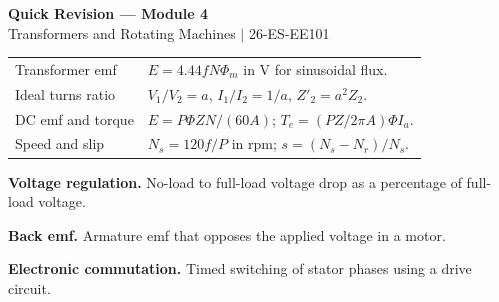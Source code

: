 \documentclass[12pt,a4paper]{article}
\renewcommand{\arraystretch}{1.45}
\begin{document}
\newpage
\begin{center}
  {\large\bfseries\color{myred} Quick Revision --- Module 4}\\[3pt]
  {\small\color{mydark} Transformers and Rotating Machines $|$ 26-ES-EE101}
\end{center}
\noindent{\color{myred}\rule{\linewidth}{1.2pt}}
\vspace{4pt}

\begin{tcolorbox}[formulabox, title={Key Formulas and Concepts at a Glance}]
\renewcommand{\arraystretch}{1.35}
\begin{tabularx}{\linewidth}{B{4.4cm}Y}
Transformer emf & $E=4.44fN\Phi_m$ in V for sinusoidal flux. \\[3pt]
Ideal turns ratio & $V_1/V_2=a$, $I_1/I_2=1/a$, $Z'_2=a^2Z_2$. \\[3pt]
DC emf and torque & $E=P\Phi ZN/(60A)$; $T_e=(PZ/2\pi A)\Phi I_a$. \\[3pt]
Speed and slip & $N_s=120f/P$ in rpm; $s=(N_s-N_r)/N_s$. \\[3pt]
\end{tabularx}
\end{tcolorbox}

\begin{tcolorbox}[defbox, title={One-Line Definitions}]
\textbf{Voltage regulation.} No-load to full-load voltage drop as a percentage of full-load voltage.

\textbf{Back emf.} Armature emf that opposes the applied voltage in a motor.

\textbf{Electronic commutation.} Timed switching of stator phases using a drive circuit.
\end{tcolorbox}
\end{document}
